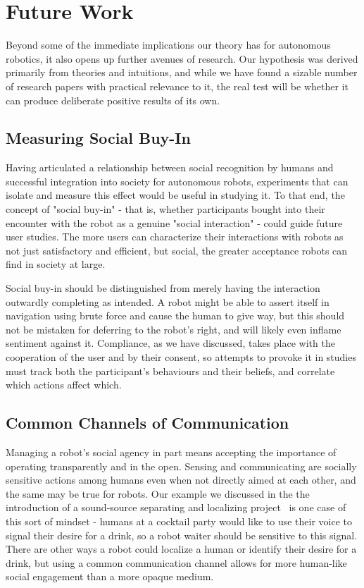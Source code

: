 \documentclass{sfuthesis}
\begin{document}
\section{Future Work}

Beyond some of the immediate implications our theory has for autonomous robotics, it also opens up further avenues of research. Our hypothesis was derived primarily from theories and intuitions, and while we have found a sizable number of research papers with practical relevance to it, the real test will be whether it can produce deliberate positive results of its own.

\subsection{Measuring Social Buy-In}

Having articulated a relationship between social recognition by humans and successful integration into society for autonomous robots, experiments that can isolate and measure this effect would be useful in studying it. To that end, the concept of "social buy-in" - that is, whether participants bought into their encounter with the robot as a genuine "social interaction" - could guide future user studies. The more users can characterize their interactions with robots as not just satisfactory and efficient, but social, the greater acceptance robots can find in society at large.

Social buy-in should be distinguished from merely having the interaction outwardly completing as intended. A robot might be able to assert itself in navigation using brute force and cause the human to give way, but this should not be mistaken for deferring to the robot's right, and will likely even inflame sentiment against it. Compliance, as we have discussed, takes place with the cooperation of the user and by their consent, so attempts to provoke it in studies must track both the participant's behaviours and their beliefs, and correlate which actions affect which.

\subsection{Common Channels of Communication}

Managing a robot's social agency in part means accepting the importance of operating transparently and in the open. Sensing and communicating are socially sensitive actions among humans even when not directly aimed at each other, and the same may be true for robots. Our example we discussed in the the introduction of a sound-source separating and localizing project~\cite{deleforge2012cocktail} is one case of this sort of mindset - humans at a cocktail party would like to use their voice to signal their desire for a drink, so a robot waiter should be sensitive to this signal. There are other ways a robot could localize a human or identify their desire for a drink, but using a common communication channel allows for more human-like social engagement than a more opaque medium.
\end{document}
